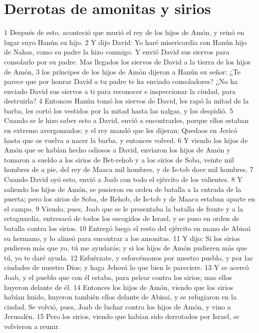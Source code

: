 \section*{Derrotas de amonitas y sirios}

1 Después de esto, aconteció que murió el rey de los hijos de Amón, y reinó en lugar suyo Hanún su hijo.
2 Y dijo David: Yo haré misericordia con Hanún hijo de Nahas, como su padre la hizo conmigo. Y envió David sus siervos para consolarlo por su padre. Mas llegados los siervos de David a la tierra de los hijos de Amón,
3 los príncipes de los hijos de Amón dijeron a Hanún su señor: ¿Te parece que por honrar David a tu padre te ha enviado consoladores? ¿No ha enviado David sus siervos a ti para reconocer e inspeccionar la ciudad, para destruirla?
4 Entonces Hanún tomó los siervos de David, les rapó la mitad de la barba, les cortó los vestidos por la mitad hasta las nalgas, y los despidió.
5 Cuando se le hizo saber esto a David, envió a encontrarles, porque ellos estaban en extremo avergonzados; y el rey mandó que les dijeran: Quedaos en Jericó hasta que os vuelva a nacer la barba, y entonces volved.
6 Y viendo los hijos de Amón que se habían hecho odiosos a David, enviaron los hijos de Amón y tomaron a sueldo a los sirios de Bet-rehob y a los sirios de Soba, veinte mil hombres de a pie, del rey de Maaca mil hombres, y de Is-tob doce mil hombres.
7 Cuando David oyó esto, envió a Joab con todo el ejército de los valientes.
8 Y saliendo los hijos de Amón, se pusieron en orden de batalla a la entrada de la puerta; pero los sirios de Soba, de Rehob, de Is-tob y de Maaca estaban aparte en el campo.
9 Viendo, pues, Joab que se le presentaba la batalla de frente y a la retaguardia, entresacó de todos los escogidos de Israel, y se puso en orden de batalla contra los sirios.
10 Entregó luego el resto del ejército en mano de Abisai su hermano, y lo alineó para encontrar a los amonitas.
11 Y dijo: Si los sirios pudieren más que yo, tú me ayudarás; y si los hijos de Amón pudieren más que tú, yo te daré ayuda.
12 Esfuérzate, y esforcémonos por nuestro pueblo, y por las ciudades de nuestro Dios; y haga Jehová lo que bien le pareciere.
13 Y se acercó Joab, y el pueblo que con él estaba, para pelear contra los sirios; mas ellos huyeron delante de él.
14 Entonces los hijos de Amón, viendo que los sirios habían huido, huyeron también ellos delante de Abisai, y se refugiaron en la ciudad. Se volvió, pues, Joab de luchar contra los hijos de Amón, y vino a Jerusalén.
15 Pero los sirios, viendo que habían sido derrotados por Israel, se volvieron a reunir.
